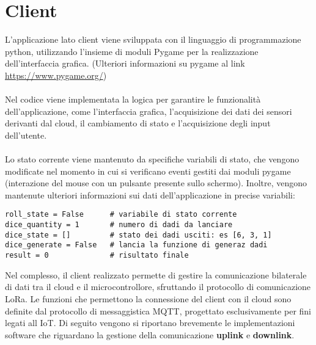 \section{Client}
L'applicazione lato client viene sviluppata con il linguaggio di programmazione python, utilizzando l'insieme di moduli Pygame 
per la realizzazione dell'interfaccia grafica. (Ulteriori informazioni su pygame al link \href{https://www.pygame.org/}{https://www.pygame.org/})
\\\\Nel codice viene implementata la logica per garantire le funzionalità dell'applicazione, come l'interfaccia grafica, l'acquisizione 
dei dati dei sensori derivanti dal cloud, il cambiamento di stato e l'acquisizione degli input dell'utente.\\\\
Lo stato corrente viene mantenuto da specifiche variabili di stato, che vengono modificate nel momento in cui si verificano eventi gestiti dai moduli pygame
(interazione del mouse con un pulsante presente sullo schermo). Inoltre, vengono mantenute ulteriori informazioni sui dati dell'applicazione in precise variabili:
\begin{verbatim}
roll_state = False      # variabile di stato corrente
dice_quantity = 1       # numero di dadi da lanciare
dice_state = []         # stato dei dadi usciti: es [6, 3, 1]
dice_generate = False   # lancia la funzione di generaz dadi
result = 0              # risultato finale
\end{verbatim}
Nel complesso, il client realizzato permette di gestire la comunicazione bilaterale di dati tra il cloud e il microcontrollore, sfruttando
il protocollo di comunicazione LoRa. Le funzioni che permettono la connessione del client con il cloud sono definite dal protocollo 
di messaggistica MQTT, progettato esclusivamente per fini legati all IoT.
Di seguito vengono si riportano brevemente le implementazioni software che riguardano la gestione della comunicazione
\textbf{uplink} e \textbf{downlink}.

